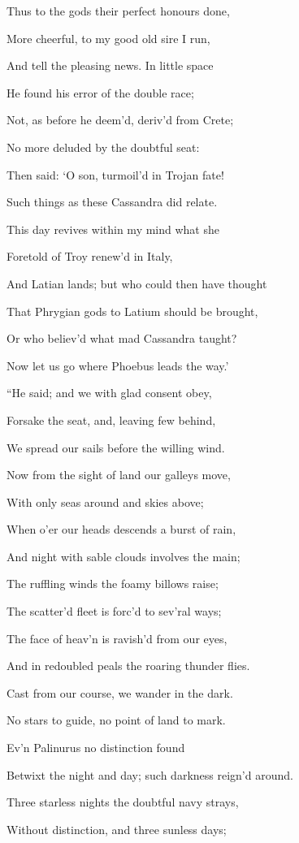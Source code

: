 Thus to the gods their perfect honours done,

More cheerful, to my good old sire I run,

And tell the pleasing news. In little space

He found his error of the double race;

Not, as before he deem’d, deriv’d from Crete;

No more deluded by the doubtful seat:

Then said: ‘O son, turmoil’d in Trojan fate!

Such things as these Cassandra did relate.

This day revives within my mind what she

Foretold of Troy renew’d in Italy,

And Latian lands; but who could then have thought

That Phrygian gods to Latium should be brought,

Or who believ’d what mad Cassandra taught?

Now let us go where Phoebus leads the way.’

“He said; and we with glad consent obey,

Forsake the seat, and, leaving few behind,

We spread our sails before the willing wind.

Now from the sight of land our galleys move,

With only seas around and skies above;

When o’er our heads descends a burst of rain,

And night with sable clouds involves the main;

The ruffling winds the foamy billows raise;

The scatter’d fleet is forc’d to sev’ral ways;

The face of heav’n is ravish’d from our eyes,

And in redoubled peals the roaring thunder flies.

Cast from our course, we wander in the dark.

No stars to guide, no point of land to mark.

Ev’n Palinurus no distinction found

Betwixt the night and day; such darkness reign’d around.

Three starless nights the doubtful navy strays,

Without distinction, and three sunless days;

